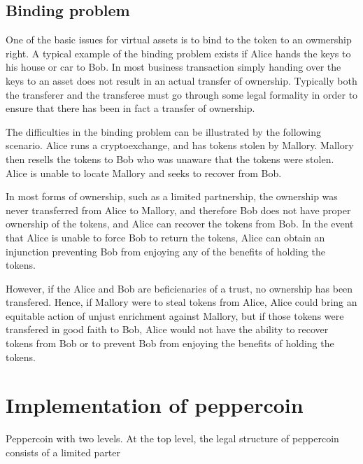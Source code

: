 \documentclass[journal]{IEEEtran}
\begin{document}
\subsection{Binding problem}
One of the basic issues for virtual assets is to bind to the token to
an owmership right.  A typical example of the binding problem exists
if Alice hands the keys to his house or car to Bob.  In most business
transaction simply handing over the keys to an asset does not result
in an actual transfer of ownership.  Typically both the transferer and
the transferee must go through some legal formality in order to ensure
that there has been in fact a transfer of ownership.

The difficulties in the binding problem can be illustrated by the
following scenario.  Alice runs a cryptoexchange, and has tokens
stolen by Mallory.  Mallory then resells the tokens to Bob who was
unaware that the tokens were stolen.  Alice is unable to locate
Mallory and seeks to recover from Bob.

In most forms of ownership, such as a limited partnership, the
ownership was never transferred from Alice to Mallory, and therefore
Bob does not have proper ownership of the tokens, and Alice can
recover the tokens from Bob.  In the event that Alice is unable to
force Bob to return the tokens, Alice can obtain an injunction
preventing Bob from enjoying any of the benefits of holding the
tokens.

However, if the Alice and Bob are beficienaries of a trust, no
ownership has been transfered.  Hence, if Mallory were to steal tokens
from Alice, Alice could bring an equitable action of unjust enrichment
against Mallory, but if those tokens were transfered in good faith to
Bob, Alice would not have the ability to recover tokens from Bob or to
prevent Bob from enjoying the benefits of holding the tokens.


\section{Implementation of peppercoin}

Peppercoin with two levels.  At the top level, the legal structure of
peppercoin consists of a limited parter
\end{document}
